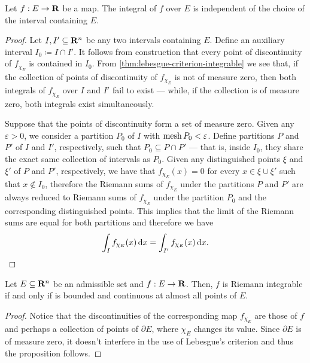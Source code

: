 \begin{lemma}
\label{lem:integral-well-defined}
Let \(f: E \to \mathbf{R}\) be a map. The integral of \(f\) over \(E\) is independent of
the choice of the interval containing \(E\).
\end{lemma}

\begin{proof}
Let \(I, I' \subseteq \mathbf{R}^n\) be any two intervals containing \(E\). Define an
auxiliary interval \(I_0 \coloneq I \cap I'\). It follows from construction that
every point of discontinuity of \(f_{\chi_E}\) is contained in \(I_0\). From
\cref{thm:lebesgue-criterion-integrable} we see that, if the collection of
points of discontinuity of \(f_{\chi_E}\) is not of measure zero, then both
integrals of \(f_{\chi_E}\) over \(I\) and \(I'\) fail to exist --- while, if
the collection is of measure zero, both integrals exist simultaneously.

Suppose that the points of discontinuity form a set of measure zero. Given any
\(\varepsilon > 0\), we consider a partition \(P_0\) of \(I\) with \(\operatorname{mesh} P_0 <
\varepsilon\). Define partitions \(P\) and \(P'\) of \(I\) and \(I'\),
respectively, such that \(P_0 \subseteq P \cap P'\) --- that is, inside \(I_0\),
they share the exact same collection of intervals as \(P_0\). Given any
distinguished points \(\xi\) and \(\xi'\) of \(P\) and \(P'\), respectively,
we have that \(f_{\chi_{E}}(x) = 0\) for every \(x \in \xi \cup \xi'\) such that
\(x \not\in I_0\), therefore the Riemann sums of \(f_{\chi_E}\) under the
partitions \(P\) and \(P'\) are always reduced to Riemann sums of \(f_{\chi_E}\)
under the partition \(P_0\) and the corresponding distinguished points. This
implies that the limit of the Riemann sums are equal for both partitions and
therefore we have
\[
  \int_I f_{\chi_E}(x)\, \mathrm{d} x = \int_{I'} f_{\chi_E}(x)\, \mathrm{d} x.
\]
\end{proof}

\begin{corollary}
\label{cor:condidion-riemann-integrable-admissible-set}
Let \(E \subseteq \mathbf{R}^n\) be an admissible set and \(f: E \to \mathbf{R}\). Then, \(f\)
is Riemann integrable if and only if is bounded and continuous at almost all
points of \(E\).
\end{corollary}

\begin{proof}
Notice that the discontinuities of the corresponding map \(f_{\chi_E}\) are
those of \(f\) and perhaps a collection of points of \(\partial E\), where
\(\chi_E\) changes its value. Since \(\partial E\) is of measure zero, it doesn't
interfere in the use of Lebesgue's criterion and thus the proposition follows.
\end{proof}

